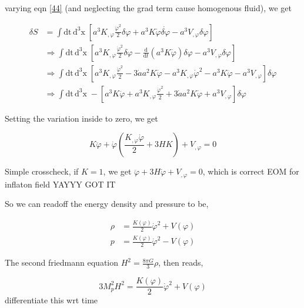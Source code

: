\documentclass{article}
\begin{document}
varying eqn \ref{44} (and neglecting the grad term cause homogenous fluid), we get

\begin{align}
    \delta S &= \int \text{dt}\,\text{d}^3\text{x} \;  \left[ a^3K_{,\varphi} \frac{\dot{\varphi}^2}{2} \delta \varphi + a^3 K \dot{\varphi} \dot{\delta \varphi} - a^3V_{,\varphi} \delta\varphi \right] \nonumber \\
    &\Rightarrow \int \text{dt}\,\text{d}^3\text{x} \;  \left[ a^3K_{,\varphi} \frac{\dot{\varphi}^2}{2} \delta \varphi - \frac{\text{d}}{\text{d}t}(a^3 K \dot{\varphi}) \delta \varphi - a^3V_{,\varphi} \delta\varphi \right] \nonumber \\
    &\Rightarrow \int \text{dt}\,\text{d}^3\text{x} \;  \left[ a^3K_{,\varphi} \frac{\dot{\varphi}^2}{2}  -  3\dot{a} a^2 K \dot{\varphi} - a^3 K_{,\varphi}\dot{\varphi}^2 - a^3 K \ddot{\varphi} - a^3V_{,\varphi}  \right]\delta \varphi
    \nonumber \\
    &\Rightarrow \int \text{dt}\,\text{d}^3\text{x} \; - \left[ a^3 K \ddot{\varphi} + a^3K_{,\varphi} \frac{\dot{\varphi}^2}{2}  +  3\dot{a} a^2 K \dot{\varphi} + a^3V_{,\varphi}  \right]\delta \varphi
\end{align}

Setting the variation inside to zero, we get

\begin{equation} \label{47}
    K \ddot{\varphi} + \dot{\varphi} \left(\frac{K_{,\varphi} \dot{\varphi}}{2} + 3H K \right) + V_{,\varphi}   = 0
\end{equation}

Simple crosscheck, if $K = 1$, we get $ \ddot{\varphi} +  3H \dot{\varphi}  + V_{,\varphi}   = 0$, which is correct EOM for inflaton field
YAYYY GOT IT

So we can readoff the energy density and pressure to be,

\begin{align}
    \rho &= \frac{K(\varphi)}{2} \dot{\varphi}^2 + V(\varphi) \nonumber \\
    p &= \frac{K(\varphi)}{2} \dot{\varphi}^2 - V(\varphi)
\end{align}

The second friedmann equation $H^2 = \frac{8 \pi G}{3} \rho$, then reads, 

\begin{equation}    \label{Friedmann Eqn 2}
    3 M_p^2H^2 = \frac{K(\varphi)}{2} \dot{\varphi}^2 + V(\varphi)
\end{equation}
differentiate this wrt time
\end{document}
